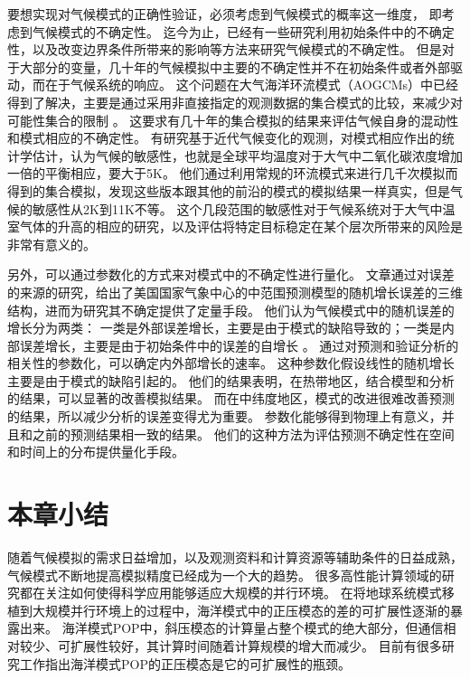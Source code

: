  
要想实现对气候模式的正确性验证，必须考虑到气候模式的概率这一维度， 即考虑到气候模式的不确定性。 
迄今为止，已经有一些研究利用初始条件中的不确定性，以及改变边界条件所带来的影响等方法来研究气候模式的不确定性。
但是对于大部分的变量，几十年的气候模拟中主要的不确定性并不在初始条件或者外部驱动，而在于气候系统的响应。
这个问题在大气海洋环流模式（AOGCMs）中已经得到了解决，主要是通过采用非直接指定的观测数据的集合模式的比较，来减少对可能性集合的限制\cite{allen2002towards} 。 
这要求有几十年的集合模拟的结果来评估气候自身的混动性和模式相应的不确定性。 
有研究基于近代气候变化的观测，对模式相应作出的统计学估计，认为气候的敏感性，也就是全球平均温度对于大气中二氧化碳浓度增加一倍的平衡相应，要大于5K\cite{stainforth2005uncertainty}。
他们通过利用常规的环流模式来进行几千次模拟而得到的集合模拟，发现这些版本跟其他的前沿的模式的模拟结果一样真实，但是气候的敏感性从2K到11K不等。
这个几段范围的敏感性对于气候系统对于大气中温室气体的升高的相应的研究，以及评估将特定目标稳定在某个层次所带来的风险是非常有意义的。



另外，可以通过参数化的方式来对模式中的不确定性进行量化。
文章通过对误差的来源的研究，给出了美国国家气象中心的中范围预测模型的随机增长误差的三维结构，进而为研究其不确定提供了定量手段。
他们认为气候模式中的随机误差的增长分为两类： 一类是外部误差增长，主要是由于模式的缺陷导致的；一类是内部误差增长，主要是由于初始条件中的误差的自增长 。 
通过对预测和验证分析的相关性的参数化，可以确定内外部增长的速率。
这种参数化假设线性的随机增长主要是由于模式的缺陷引起的。 
他们的结果表明，在热带地区，结合模型和分析的结果，可以显著的改善模拟结果。
而在中纬度地区，模式的改进很难改善预测的结果，所以减少分析的误差变得尤为重要。 
参数化能够得到物理上有意义，并且和之前的预测结果相一致的结果。
他们的这种方法为评估预测不确定性在空间和时间上的分布提供量化手段。


\section{本章小结}
\label{related:Conclude}

随着气候模拟的需求日益增加，以及观测资料和计算资源等辅助条件的日益成熟，气候模式不断地提高模拟精度已经成为一个大的趋势。
很多高性能计算领域的研究都在关注如何使得科学应用能够适应大规模的并行环境。 
在将地球系统模式移植到大规模并行环境上的过程中，海洋模式中的正压模态的差的可扩展性逐渐的暴露出来。 
海洋模式POP中，斜压模态的计算量占整个模式的绝大部分，但通信相对较少、可扩展性较好，其计算时间随着计算规模的增大而减少。
目前有很多研究工作指出海洋模式POP的正压模态是它的可扩展性的瓶颈。


